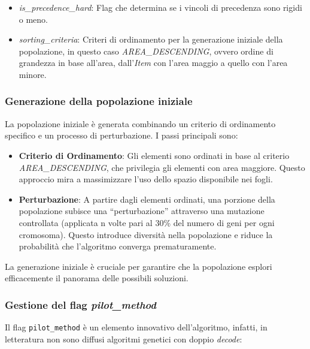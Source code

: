 \begin{itemize}
    \item \emph{is\_precedence\_hard}: Flag che determina se i vincoli di precedenza sono rigidi o meno.
    \item \emph{sorting\_criteria}: Criteri di ordinamento per la generazione iniziale della popolazione, in questo caso \emph{AREA\_DESCENDING}, ovvero ordine di grandezza in base all'area, dall'\emph{Item} con l'area maggio a quello con l'area minore.
\end{itemize}

\subsubsection*{Generazione della popolazione iniziale}

La popolazione iniziale è generata combinando un criterio di ordinamento specifico e un processo di perturbazione. I passi principali sono:

\begin{itemize}
    \item \textbf{Criterio di Ordinamento}: Gli elementi sono ordinati in base al criterio \emph{AREA\_DESCENDING}, che privilegia gli elementi con area maggiore. Questo approccio mira a massimizzare l'uso dello spazio disponibile nei fogli.
    \item \textbf{Perturbazione}: A partire dagli elementi ordinati, una porzione della popolazione subisce una ``perturbazione'' attraverso una mutazione controllata (applicata n volte pari al 30\% del numero di geni per ogni cromosoma). Questo introduce diversità nella popolazione e riduce la probabilità che l'algoritmo converga prematuramente.
\end{itemize}

La generazione iniziale è cruciale per garantire che la popolazione esplori efficacemente il panorama delle possibili soluzioni.

\subsubsection*{Gestione del flag \emph{pilot\_method}}
Il flag \texttt{pilot\_method} è un elemento innovativo dell'algoritmo, infatti, in letteratura non sono diffusi algoritmi genetici con doppio \emph{decode}:

